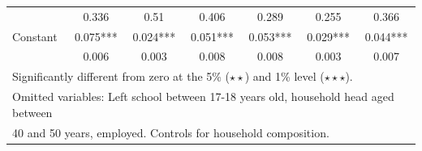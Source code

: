 \begin{table}
\begin{tabular}{l|ccc|ccc}
	&	       0.336   	&	0.51	&	0.406	&	       0.289   	&	0.255	&	0.366	\\
Constant            	&	       0.075***	&	       0.024***	&	       0.051***	&	       0.053***	&	       0.029***	&	       0.044***	\\
                    	&	       0.006   	&	0.003	&	0.008	&	       0.008   	&	0.003	&	0.007	\\
\hline\hline
\multicolumn{7}{l}{Significantly different from zero at the 5\% ($\star\star$) and 1\% level ($\star\star\star$).} \\
\multicolumn{7}{l}{Omitted variables: Left school between 17-18 years old, household head aged between} \\
\multicolumn{7}{l}{40 and 50 years, employed. Controls for household composition.} 
\end{tabular}
\end{table}

